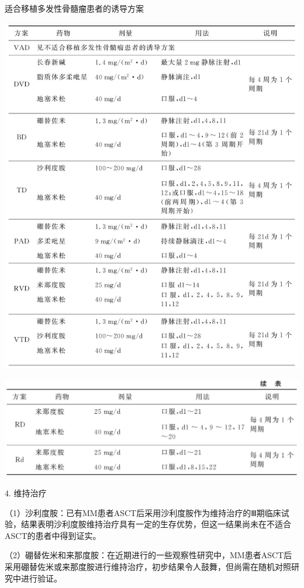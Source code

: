 \begin{table}[htbp]
\centering
\caption{适合移植多发性骨髓瘤患者的诱导方案}
\label{tab5-4-4}
\includegraphics{./images/Image00162.jpg}
\end{table}
\includegraphics{./images/Image00163.jpg}

4. 维持治疗

（1）沙利度胺：已有MM患者ASCT后采用沙利度胺作为维持治疗的Ⅲ期临床试验，结果表明沙利度胺维持治疗具有一定的生存优势，但这一结果尚未在不适合ASCT的患者中得到证实。

（2）硼替佐米和来那度胺：在近期进行的一些观察性研究中，MM患者ASCT后采用硼替佐米或来那度胺进行维持治疗，初步结果令人鼓舞，但尚需在随机对照研究中进行验证。

